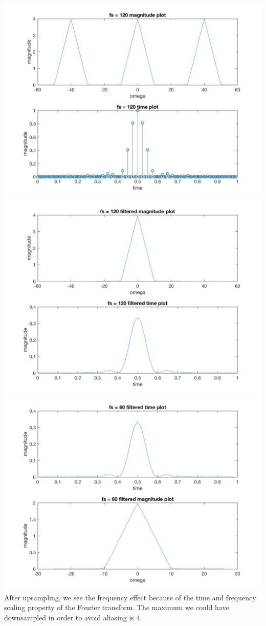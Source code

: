 \documentclass{article}
\begin{document}
\includegraphics[scale=.5]{Chipotle2}
\includegraphics[scale=.5]{Chipotle3}
\includegraphics[scale=.5]{Chipotle4}
After upsampling, we see the frequency effect because of the time and frequency scaling property of the Fourier transform. The maximum we could have downsampled in order to avoid aliasing is 4.
\end{document}

